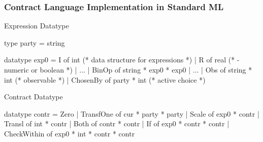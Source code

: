 \documentclass[xcolor=dvipsnames,11pt]{beamer}
\renewcommand{\emph}[1]{\textcolor{structure!60}{#1}}
\begin{document}
\begin{frame}[fragile,t]
    \frametitle{Contract Language Implementation in Standard ML}
\emph{Expression Datatype}
\begin{mlcode}
type party = string
                       
datatype exp0 = I of int  (* data structure for expressions *)
              | R of real (*  - numeric or boolean *)
              | ...
              | BinOp of string * exp0 * exp0
              | ...
              | Obs of string * int     (* observable *)
              | ChosenBy of party * int (* active choice *)
\end{mlcode}

\emph{Contract Datatype}
\begin{mlcode}
datatype contr =
       Zero
     | TransfOne of cur * party * party
     | Scale of exp0 * contr
     | Transl of int * contr
     | Both of contr * contr
     | If of exp0 * contr * contr
     | CheckWithin of exp0 * int * contr * contr
\end{mlcode}
%
\end{frame}
\end{document}
